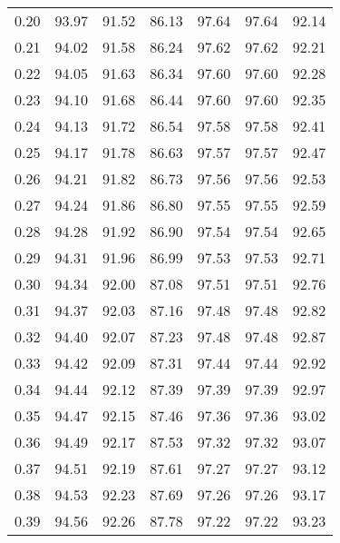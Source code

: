\begin{tabular}{|c|c|c|c|c|c|c|}
      0.20 &     93.97 &     91.52 &      86.13 &   97.64 &      97.64 &         92.14 \\
      0.21 &     94.02 &     91.58 &      86.24 &   97.62 &      97.62 &         92.21 \\
      0.22 &     94.05 &     91.63 &      86.34 &   97.60 &      97.60 &         92.28 \\
      0.23 &     94.10 &     91.68 &      86.44 &   97.60 &      97.60 &         92.35 \\
      0.24 &     94.13 &     91.72 &      86.54 &   97.58 &      97.58 &         92.41 \\
      0.25 &     94.17 &     91.78 &      86.63 &   97.57 &      97.57 &         92.47 \\
      0.26 &     94.21 &     91.82 &      86.73 &   97.56 &      97.56 &         92.53 \\
      0.27 &     94.24 &     91.86 &      86.80 &   97.55 &      97.55 &         92.59 \\
      0.28 &     94.28 &     91.92 &      86.90 &   97.54 &      97.54 &         92.65 \\
      0.29 &     94.31 &     91.96 &      86.99 &   97.53 &      97.53 &         92.71 \\
      0.30 &     94.34 &     92.00 &      87.08 &   97.51 &      97.51 &         92.76 \\
      0.31 &     94.37 &     92.03 &      87.16 &   97.48 &      97.48 &         92.82 \\
      0.32 &     94.40 &     92.07 &      87.23 &   97.48 &      97.48 &         92.87 \\
      0.33 &     94.42 &     92.09 &      87.31 &   97.44 &      97.44 &         92.92 \\
      0.34 &     94.44 &     92.12 &      87.39 &   97.39 &      97.39 &         92.97 \\
      0.35 &     94.47 &     92.15 &      87.46 &   97.36 &      97.36 &         93.02 \\
      0.36 &     94.49 &     92.17 &      87.53 &   97.32 &      97.32 &         93.07 \\
      0.37 &     94.51 &     92.19 &      87.61 &   97.27 &      97.27 &         93.12 \\
      0.38 &     94.53 &     92.23 &      87.69 &   97.26 &      97.26 &         93.17 \\
      0.39 &     94.56 &     92.26 &      87.78 &   97.22 &      97.22 &         93.23 \\

\end{tabular}
